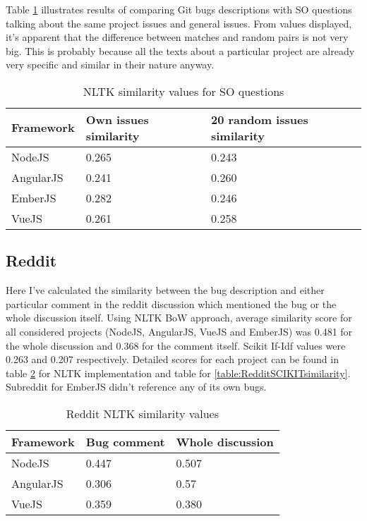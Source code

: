 Table \ref{table:StackOverflowNLTKsimilarity} illustrates results of comparing Git bugs descriptions with SO questions talking about the same project issues and general issues. From values displayed, it's apparent that the difference between matches and random pairs is not very big. This is probably because all the texts about a particular project are already very specific and similar in their nature anyway.

\begin{table}[H]
\centering
\begin{tabular}{ |p{3cm}||p{4.5cm}|p{5.5cm}|}
 \hline
\textbf{ Framework }& \textbf{Own issues similarity}& \textbf{20 random issues similarity}\\
 \hline
 NodeJS   & 0.265 & 0.243\\ \hline
 AngularJS & 0.241 & 0.260\\ \hline
 EmberJS & 0.282 & 0.246\\ \hline 
 VueJS &   0.261 & 0.258\\ \hline
\end{tabular}
\caption{NLTK similarity values for SO questions}
\label{table:StackOverflowNLTKsimilarity}
\end{table}

\subsection{Reddit}Here I've calculated the similarity between the bug description and either particular comment in the reddit discussion which mentioned the bug or the whole discussion itself. Using NLTK BoW approach, average similarity score for all considered projects (NodeJS, AngularJS, VueJS and EmberJS) was 0.481 for the whole discussion and 0.368 for the comment itself. Scikit If-Idf values were 0.263 and 0.207 respectively. Detailed scores for each project can be found in table \ref{table:RedditNLTKsimilarity} for NLTK implementation and  table for \ref{table:RedditSCIKITsimilarity}. Subreddit for EmberJS didn't reference any of its own bugs.

\begin{table}[H]
\centering
\begin{tabular}{ |p{3cm}||p{3cm}|p{4cm}|}
 \hline
\textbf{ Framework }& \textbf{Bug comment}& \textbf{Whole discussion}\\
 \hline
 NodeJS   & 0.447 & 0.507\\ \hline 
 AngularJS & 0.306 & 0.57 \\ \hline 
 VueJS &   0.359 & 0.380\\ \hline
\end{tabular}
\caption{Reddit NLTK similarity values}
\label{table:RedditNLTKsimilarity}
\end{table}

